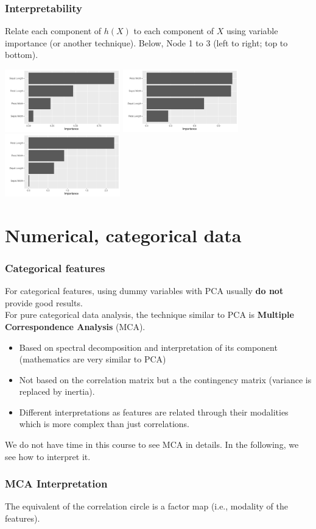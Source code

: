 \begin{frame}
\frametitle{Interpretability}
Relate each component of $h(X)$ to each component of $X$ using variable importance (or another technique). Below, Node 1 to 3 (left to right; top to bottom).
\begin{center}
\includegraphics[width=5cm]{../../Graphs/Iris_AE_VImp1.png}
\includegraphics[width=5cm]{../../Graphs/Iris_AE_VImp2.png}
\includegraphics[width=5cm]{../../Graphs/Iris_AE_VImp3.png}
\end{center}
\end{frame}


\section{Numerical, categorical data}
\begin{frame}
\frametitle{Categorical features}
For categorical features, using dummy variables with PCA usually {\bf do not} provide good results.\\
\vspace{0.2cm}
For pure categorical data analysis, the technique similar to PCA is {\bf Multiple Correspondence Analysis} (MCA). 
\begin{itemize}
\item Based on spectral decomposition and interpretation of its component (mathematics are very similar to PCA)
\item Not based on the correlation matrix but a the contingency matrix (variance is replaced by inertia).
\item Different interpretations as features are related through their modalities which is more complex than just correlations.
\end{itemize}
We do not have time in this course to see MCA in details. In the following, we see how to interpret it.
\end{frame}
\begin{frame}
\frametitle{MCA Interpretation}
The equivalent of the correlation circle is a factor map (i.e., modality of the features).

\end{frame}

